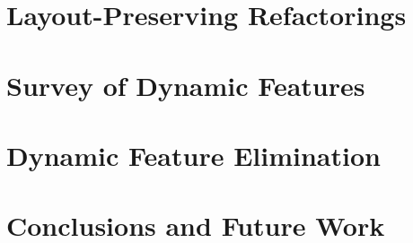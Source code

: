 \documentclass[MSc,twoside,openright]{Thesis}
\begin{document}
\chapter{Layout-Preserving Refactorings} \label{chap:LayoutPreservingRefactorings}


\chapter{Survey of Dynamic Features} \label{chap:DynamicFeatureSurvey}


\chapter{Dynamic Feature Elimination} \label{chap:DynamicFeatureElimination}


\chapter{Conclusions and Future Work} \label{chap:Conclusions}


\appendix %




%

%



%
%
\end{document}
